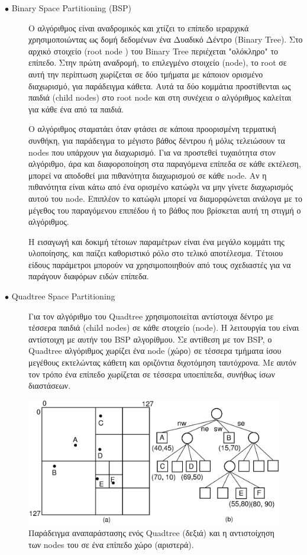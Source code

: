 \begin{description}
  \item[$\bullet$ Binary Space Partitioning (BSP)]
  Ο αλγόριθμος είναι αναδρομικός και χτίζει το επίπεδο ιεραρχικά χρησιμοποιώντας ως δομή δεδομένων ένα Δυαδικό Δέντρο (Binary Tree). Στο αρχικό στοιχείο (root node ) του Binary Tree περιέχεται "ολόκληρο" το επίπεδο. Στην πρώτη αναδρομή, το επιλεγμένο στοιχείο (node), το root σε αυτή την περίπτωση χωρίζεται σε δύο τμήματα με κάποιον ορισμένο διαχωρισμό, για παράδειγμα κάθετα. Αυτά τα δύο κομμάτια προστίθενται ως παιδιά (child nodes) στο root node και στη συνέχεια ο αλγόριθμος καλείται για κάθε ένα από τα παιδιά.
  \par
  Ο αλγόριθμος σταματάει όταν φτάσει σε κάποια προορισμένη τερματική συνθήκη, για παράδειγμα το μέγιστο βάθος δέντρου ή μόλις τελειώσουν τα nodes που υπάρχουν για διαχωρισμό. Για να προστεθεί τυχαιότητα στον αλγόριθμο, άρα και διαφοροποίηση στα παραγόμενα επίπεδα σε κάθε εκτέλεση, μπορεί να αποδοθεί μια πιθανότητα διαχωρισμού σε κάθε node. Αν η πιθανότητα είναι κάτω από ένα ορισμένο κατώφλι να μην γίνετε διαχωρισμός αυτού του node. Επιπλέον το κατώφλι μπορεί να διαμορφώνεται ανάλογα με το μέγεθος του παραγόμενου επιπέδου ή το βάθος που βρίσκεται αυτή τη στιγμή ο αλγόριθμος.
  \par 
  Η εισαγωγή και δοκιμή τέτοιων παραμέτρων είναι ένα μεγάλο κομμάτι της υλοποίησης, και παίζει καθοριστικό ρόλο στο τελικό αποτέλεσμα. Τέτοιου είδους παράμετροι μπορούν να χρησιμοποιηθούν από τους σχεδιαστές για να παράγουν διαφόρων ειδών επίπεδα.
\end{description}

\begin{description}
  \item[$\bullet$ Quadtree Space Partitioning]
  Για τον αλγόριθμο του Quadtree χρησιμοποιείται αντίστοιχα δέντρο με τέσσερα παιδιά (child nodes) σε κάθε στοιχείο (node). Η λειτουργία του είναι αντίστοιχη με αυτήν του BSP αλγορίθμου. Σε αντίθεση με τον BSP, ο Quadtree αλγόριθμος χωρίζει ένα node (χώρο) σε τέσσερα τμήματα ίσου μεγέθους εκτελώντας κάθετη και οριζόντια διχοτόμηση ταυτόχρονα. Με αυτόν τον τρόπο ένα επίπεδο χωρίζεται σε τέσσερα υποεπίπεδα, συνήθως ίσων διαστάσεων. 
\end{description}

\begin{figure}[H]
\centering
\includegraphics[width=.8\linewidth]{../images/other/quadtree.png}
\caption{Παράδειγμα αναπαράστασης ενός Quadtree (δεξιά) και η αντιστοίχηση των nodes του σε ένα επίπεδο χώρο (αριστερά).}
\label{fig:fig}
\end{figure}

